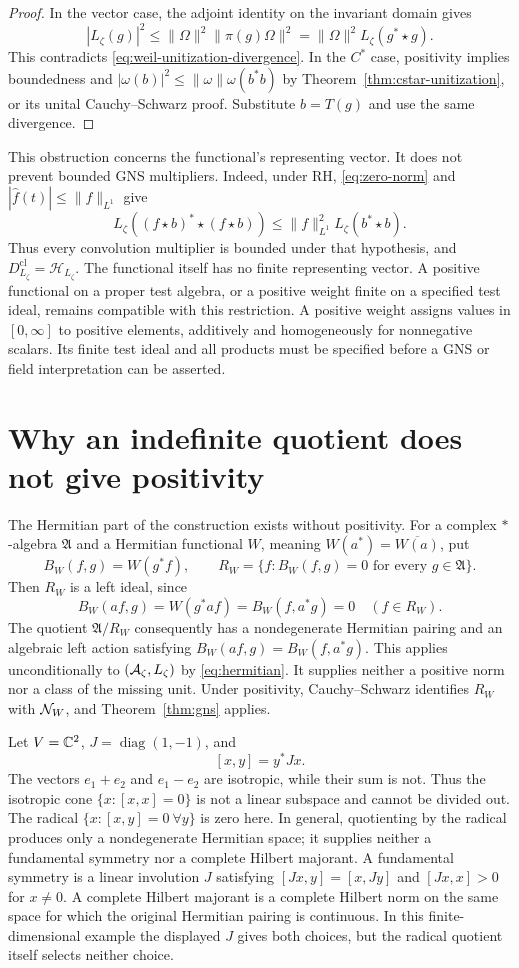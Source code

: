 \begin{proof}
In the vector case, the adjoint identity on the invariant domain gives
\[
 |L_\zeta(g)|^2
 \leq\|\Omega\|^2\|\pi(g)\Omega\|^2
 =\|\Omega\|^2L_\zeta(g^*\star g).
\]
This contradicts \eqref{eq:weil-unitization-divergence}.
In the $C^*$ case, positivity implies boundedness and
$|\omega(b)|^2\leq\|\omega\|\omega(b^*b)$ by
Theorem~\ref{thm:cstar-unitization}, or its unital Cauchy--Schwarz proof.
Substitute $b=T(g)$ and use the same divergence.
\end{proof}

This obstruction concerns the functional's representing vector.
It does not prevent bounded GNS multipliers.  Indeed, under RH,
\eqref{eq:zero-norm} and $|\widehat f(t)|\leq\|f\|_{L^1}$ give
\[
 L_\zeta((f\star b)^*\star(f\star b))
 \leq\|f\|_{L^1}^2 L_\zeta(b^*\star b).
\]
Thus every convolution multiplier is bounded under that hypothesis,
and $D_{L_\zeta}^{\mathrm{cl}}=\mathcal H_{L_\zeta}$.
The functional itself has no finite representing vector.
A positive functional on a proper test algebra, or a positive weight
finite on a specified test ideal, remains compatible with this restriction.
A positive weight assigns values in $[0,\infty]$ to positive elements,
additively and homogeneously for nonnegative scalars.  Its finite test
ideal and all products must be specified before a GNS or field
interpretation can be asserted.

\section{Why an indefinite quotient does not give positivity}

The Hermitian part of the construction exists without positivity.
For a complex $*$-algebra $\mathfrak A$ and a Hermitian functional $W$,
meaning $W(a^*)=\overline{W(a)}$, put
\[
 B_W(f,g)=W(g^*f),\qquad
 R_W=\{f:B_W(f,g)=0\text{ for every }g\in\mathfrak A\}.
\]
Then $R_W$ is a left ideal, since
\[
 B_W(af,g)=W(g^*af)=B_W(f,a^*g)=0\quad(f\in R_W).
\]
The quotient $\mathfrak A/R_W$ consequently has a nondegenerate Hermitian
pairing and an algebraic left action satisfying
$B_W(af,g)=B_W(f,a^*g)$.
This applies unconditionally to $(\mathcal A_\zeta,L_\zeta)$ by
\eqref{eq:hermitian}.  It supplies neither a positive norm nor a class of
the missing unit.  Under positivity, Cauchy--Schwarz identifies $R_W$
with $\mathcal N_W$, and Theorem~\ref{thm:gns} applies.

Let $V=\mathbb C^2$, $J=\operatorname{diag}(1,-1)$, and
\[
 [x,y]=y^*Jx.
\]
The vectors $e_1+e_2$ and $e_1-e_2$ are isotropic, while their sum is
not.  Thus the isotropic cone $\{x:[x,x]=0\}$ is not a linear subspace
and cannot be divided out.  The radical
$\{x:[x,y]=0\ \forall y\}$ is zero here.  In general, quotienting by the
radical produces only a nondegenerate Hermitian space; it supplies
neither a fundamental symmetry nor a complete Hilbert majorant.
A fundamental symmetry is a linear involution $J$ satisfying
$[Jx,y]=[x,Jy]$ and $[Jx,x]>0$ for $x\ne0$.
A complete Hilbert majorant is a complete Hilbert norm on the same space
for which the original Hermitian pairing is continuous.
In this finite-dimensional example the displayed $J$ gives both choices,
but the radical quotient itself selects neither choice.

